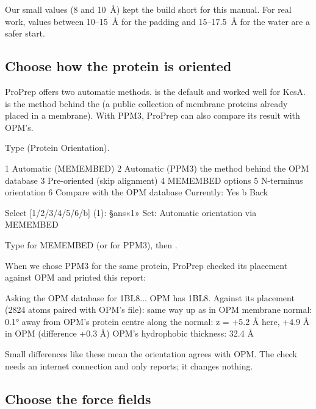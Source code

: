 \begin{tip}
Our small values (8 and 10~\AA) kept the build short for this manual. For real
work, values between 10--15~\AA{} for the padding and 15--17.5~\AA{} for the
water are a safer start.
\end{tip}

\subsection{Choose how the protein is oriented}

ProPrep offers two automatic methods.  is the default and
worked well for KcsA.  is the method behind the 
(a public collection of membrane proteins already placed in a membrane). With
PPM3, ProPrep can also compare its result with OPM's.

\begin{steps}
  \item Type  (\textsf{Protein Orientation}).
\begin{screen}
    1   Automatic (MEMEMBED)
    2   Automatic (PPM3)              the method behind the OPM database
    3   Pre-oriented (skip alignment)
    4   MEMEMBED options
    5   N-terminus orientation
    6   Compare with the OPM database   Currently: Yes
    b   Back

Select [1/2/3/4/5/6/b] (1): §ans«1»
Set: Automatic orientation via MEMEMBED
\end{screen}
  \item Type  for MEMEMBED (or  for PPM3), then .
\end{steps}

When we chose PPM3 for the same protein, ProPrep checked its placement against
OPM and printed this report:

\begin{screen}
  Asking the OPM database for 1BL8...
  OPM has 1BL8. Against its placement (2824 atoms paired with OPM's file):
    same way up as in OPM
    membrane normal: 0.1° away from OPM's
    protein centre along the normal: z = +5.2 Å here, +4.9 Å in OPM
    (difference +0.3 Å)
    OPM's hydrophobic thickness: 32.4 Å
\end{screen}

Small differences like these mean the orientation agrees with OPM. The check
needs an internet connection and only reports; it changes nothing.

\subsection{Choose the force fields}
\label{sec:membrane-ff}

